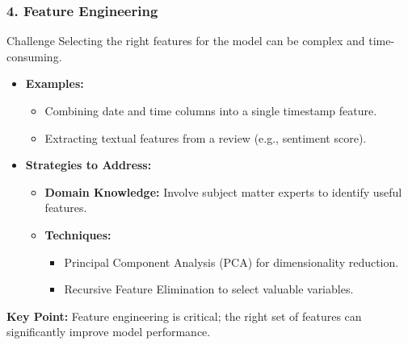 \documentclass[aspectratio=169]{beamer}
\begin{document}
\begin{frame}[fragile]
  \frametitle{4. Feature Engineering}
  \begin{block}{Challenge}
    Selecting the right features for the model can be complex and time-consuming.
  \end{block}

  \begin{itemize}
    \item \textbf{Examples:}
      \begin{itemize}
        \item Combining date and time columns into a single timestamp feature.
        \item Extracting textual features from a review (e.g., sentiment score).
      \end{itemize}
    
    \item \textbf{Strategies to Address:}
      \begin{itemize}
        \item \textbf{Domain Knowledge:} Involve subject matter experts to identify useful features.
        \item \textbf{Techniques:}
          \begin{itemize}
            \item Principal Component Analysis (PCA) for dimensionality reduction.
            \item Recursive Feature Elimination to select valuable variables.
          \end{itemize}
      \end{itemize}
  \end{itemize}

  \textbf{Key Point:} Feature engineering is critical; the right set of features can significantly improve model performance.
\end{frame}
\end{document}
